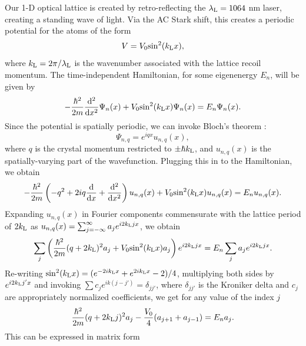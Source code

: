 	Our 1-D optical lattice is created by retro-reflecting the  $\lambda_{\rm L} = 1064 $ nm laser, creating a standing wave of light. Via the AC Stark shift, this creates a periodic potential for the atoms of the form
\begin{equation}
V = V_0 {\rm sin}^2 (k_{\rm L} x),
\end{equation} 
where $k_{\rm L} = 2\pi/\lambda_{\rm L}$ is the wavenumber associated with the lattice recoil momentum. The time-independent Hamiltonian, for some eigenenergy $E_n$, will be given by
\begin{equation}
-\frac{\hbar^2}{2 m}\frac{{\rm d}^2}{{\rm d}x^2}\Psi_n(x)+V_0 {\rm sin}^2 (k_{\rm L} x) \Psi_n(x) = E_n \Psi_n(x).
\end{equation}
Since the potential is spatially periodic, we can invoke Bloch's theorem \cite{Ashcroft}:
\begin{equation}
\Psi_{n,q} =  e^{iqx}u_{n,q}(x), 
\end{equation}
where $q$ is the crystal momentum restricted to $\pm\hbar k_{\rm L}$, and $u_{n,q}(x)$ is the spatially-varying part of the wavefunction. 
Plugging this in to the Hamiltonian, we obtain
\begin{equation}
-\frac{\hbar^2}{2m}\left(-q^2 + 2iq\frac{{\rm d}}{{\rm d}x} + \frac{{\rm d}^2}{{\rm d}x^2}\right) u_{n,q}(x) + V_0{\rm sin}^2(k_{\rm L} x) u_{n,q}(x) = E_n u_{n,q}(x).
\end{equation}
Expanding $u_{n,q}(x)$  in Fourier components commensurate with the lattice period of $2 k_{\rm L}$ as $u_{n,q}(x) = \sum_{j=-\infty}^{\infty} a_j e^{i 2 k_{\rm L} j x}$, we obtain
\begin{equation}
\sum_j \left(\frac{\hbar^2}{2m}(q + 2 k_{\rm L})^2 a_j + V_0 {\rm sin}^2(k_{\rm L} x) a_j\right) e^{i 2 k_{\rm L} j x} = E_n\sum_j a_j  e^{i 2 k_{\rm L} j x}.
\end{equation}
Re-writing ${\rm sin}^2(k_{\rm L} x) = (e^{-2ik_{\rm L} x} + e^{2 i k_{\rm L} x} - 2)/4$, multiplying both sides by $e^{i 2 k_{\rm L} j' x}$ and invoking $\sum c_j e^{i k (j-j')} = \delta_{jj'}$, where $\delta_{j j'}$ is the Kroniker delta and $c_j$ are appropriately normalized coefficients, we get for any value of the index $j$
\begin{equation}
\frac{\hbar^2}{2m}(q + 2 k_{\rm L} j)^2 a_j - \frac{V_0}{4}(a_{j+1}+a_{j-1}) = E_n a_j.
\end{equation}
This can be expressed in matrix form
